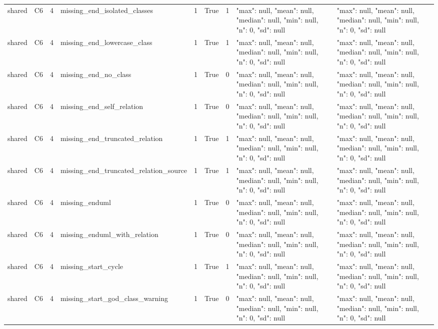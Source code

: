 \begin{tabular}{lllllllll}
shared & C6 & 4 & missing\_end\_isolated\_classes & 1 & True & 1 & {"max": null, "mean": null, "median": null, "min": null, "n": 0, "sd": null} & {"max": null, "mean": null, "median": null, "min": null, "n": 0, "sd": null} \\
shared & C6 & 4 & missing\_end\_lowercase\_class & 1 & True & 1 & {"max": null, "mean": null, "median": null, "min": null, "n": 0, "sd": null} & {"max": null, "mean": null, "median": null, "min": null, "n": 0, "sd": null} \\
shared & C6 & 4 & missing\_end\_no\_class & 1 & True & 0 & {"max": null, "mean": null, "median": null, "min": null, "n": 0, "sd": null} & {"max": null, "mean": null, "median": null, "min": null, "n": 0, "sd": null} \\
shared & C6 & 4 & missing\_end\_self\_relation & 1 & True & 0 & {"max": null, "mean": null, "median": null, "min": null, "n": 0, "sd": null} & {"max": null, "mean": null, "median": null, "min": null, "n": 0, "sd": null} \\
shared & C6 & 4 & missing\_end\_truncated\_relation & 1 & True & 1 & {"max": null, "mean": null, "median": null, "min": null, "n": 0, "sd": null} & {"max": null, "mean": null, "median": null, "min": null, "n": 0, "sd": null} \\
shared & C6 & 4 & missing\_end\_truncated\_relation\_source & 1 & True & 1 & {"max": null, "mean": null, "median": null, "min": null, "n": 0, "sd": null} & {"max": null, "mean": null, "median": null, "min": null, "n": 0, "sd": null} \\
shared & C6 & 4 & missing\_enduml & 1 & True & 0 & {"max": null, "mean": null, "median": null, "min": null, "n": 0, "sd": null} & {"max": null, "mean": null, "median": null, "min": null, "n": 0, "sd": null} \\
shared & C6 & 4 & missing\_enduml\_with\_relation & 1 & True & 0 & {"max": null, "mean": null, "median": null, "min": null, "n": 0, "sd": null} & {"max": null, "mean": null, "median": null, "min": null, "n": 0, "sd": null} \\
shared & C6 & 4 & missing\_start\_cycle & 1 & True & 1 & {"max": null, "mean": null, "median": null, "min": null, "n": 0, "sd": null} & {"max": null, "mean": null, "median": null, "min": null, "n": 0, "sd": null} \\
shared & C6 & 4 & missing\_start\_god\_class\_warning & 1 & True & 0 & {"max": null, "mean": null, "median": null, "min": null, "n": 0, "sd": null} & {"max": null, "mean": null, "median": null, "min": null, "n": 0, "sd": null} \\

\end{tabular}

